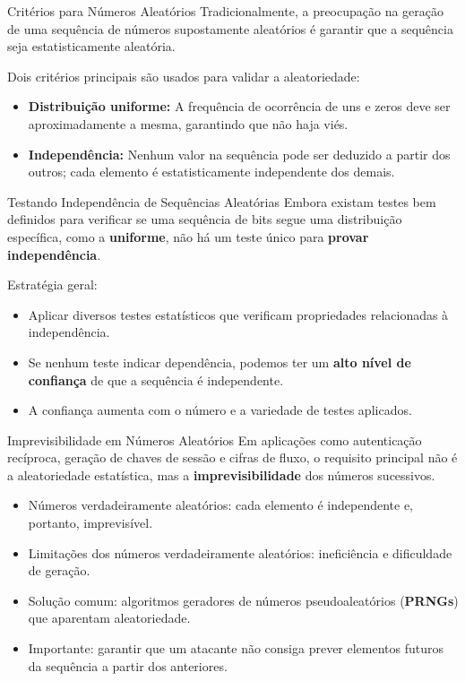 \begin{frame}{Critérios para Números Aleatórios}
Tradicionalmente, a preocupação na geração de uma sequência de números supostamente aleatórios é garantir que a sequência seja estatisticamente aleatória.  

\medskip
Dois critérios principais são usados para validar a aleatoriedade:

\begin{itemize}
    \item \textbf{Distribuição uniforme:}  
    A frequência de ocorrência de uns e zeros deve ser aproximadamente a mesma, garantindo que não haja viés.
    
    \item \textbf{Independência:}  
    Nenhum valor na sequência pode ser deduzido a partir dos outros; cada elemento é estatisticamente independente dos demais.
\end{itemize}

\end{frame}

\begin{frame}{Testando Independência de Sequências Aleatórias}
Embora existam testes bem definidos para verificar se uma sequência de bits segue uma distribuição específica, como a \textbf{uniforme}, não há um teste único para \textbf{provar independência}.

\medskip
Estratégia geral:

\begin{itemize}
    \item Aplicar diversos testes estatísticos que verificam propriedades relacionadas à independência.
    \item Se nenhum teste indicar dependência, podemos ter um \textbf{alto nível de confiança} de que a sequência é independente.
    \item A confiança aumenta com o número e a variedade de testes aplicados.
\end{itemize}

\end{frame}


\begin{frame}{Imprevisibilidade em Números Aleatórios}
Em aplicações como autenticação recíproca, geração de chaves de sessão e cifras de fluxo, o requisito principal não é a aleatoriedade estatística, mas a \textbf{imprevisibilidade} dos números sucessivos.

\medskip
\begin{itemize}
    \item Números verdadeiramente aleatórios: cada elemento é independente e, portanto, imprevisível.
    \item Limitações dos números verdadeiramente aleatórios: ineficiência e dificuldade de geração.
    \item Solução comum: algoritmos geradores de números pseudoaleatórios (\textbf{PRNGs}) que aparentam aleatoriedade.
    \item Importante: garantir que um atacante não consiga prever elementos futuros da sequência a partir dos anteriores.
\end{itemize}

\end{frame}

